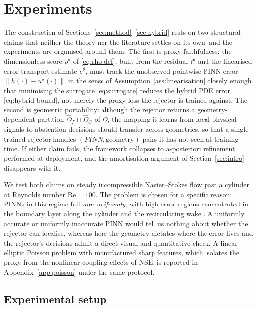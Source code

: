 \section{Experiments}
\label{sec:experiments}

The construction of Sections~\ref{sec:method}--\ref{sec:hybrid} rests
on two structural claims that neither the theory nor the literature
settles on its own, and the experiments are organised around them.
The first is proxy faithfulness: the dimensionless score $\rho^\theta$
of \eqref{eq:rho-def}, built from the residual $\mathfrak{r}^\theta$
and the linearised error-transport estimate $e^\theta$, must track
the unobserved pointwise PINN error $\|h(\cdot)-u^\star(\cdot)\|$ in
the sense of Assumption~\ref{ass:linearisation} closely enough that
minimising the surrogate \eqref{eq:surrogate} reduces the hybrid PDE
error \eqref{eq:hybrid-bound}, not merely the proxy loss the rejector
is trained against. The second is geometric portability: although
the rejector returns a geometry-dependent partition
$\widehat{\Omega}_P\sqcup\widehat{\Omega}_C$ of $\Omega$, the mapping
it learns from local physical signals to abstention decisions should
transfer across geometries, so that a single trained rejector handles
$(PINN,\text{geometry})$ pairs it has not seen at training time. If
either claim fails, the framework collapses to a-posteriori
refinement performed at deployment, and the amortisation argument of
Section~\ref{sec:intro} disappears with it.

We test both claims on steady incompressible Navier--Stokes flow past
a cylinder at Reynolds number $\mathrm{Re}=100$. The problem is
chosen for a specific reason: PINNs in this regime fail
\emph{non-uniformly}, with high-error regions concentrated in the
boundary layer along the cylinder and the recirculating wake
\citep{rao2020physics,wang2022whenpinns,krishnapriyan2021}. A
uniformly accurate or uniformly inaccurate PINN would tell us nothing
about whether the rejector can localise, whereas here the geometry
dictates where the error lives and the rejector's decisions admit a
direct visual and quantitative check. A linear-elliptic Poisson
problem with manufactured sharp features, which isolates the proxy
from the nonlinear coupling effects of NSE, is reported in
Appendix~\ref{app:poisson} under the same protocol.

\subsection{Experimental setup}
\label{sec:exp-setup}

